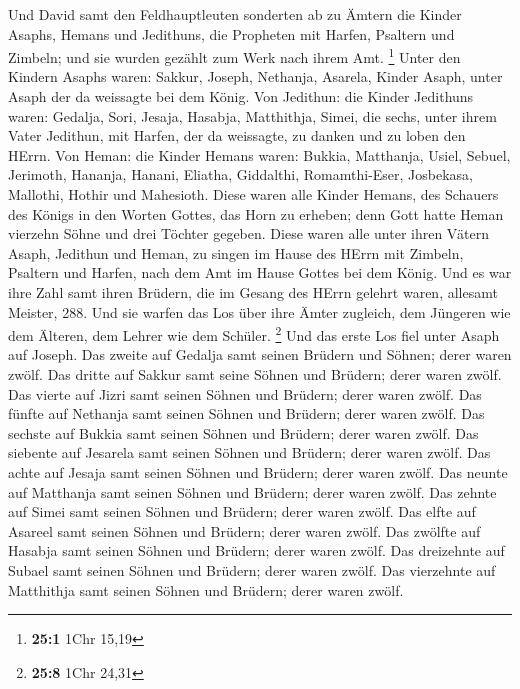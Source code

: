  Und David samt den Feldhauptleuten sonderten ab zu Ämtern
die Kinder Asaphs, Hemans und Jedithuns, die Propheten mit Harfen,
Psaltern und Zimbeln; und sie wurden gezählt zum Werk nach ihrem Amt.
\footnote{\textbf{25:1} 1Chr 15,19}  Unter den Kindern
Asaphs waren: Sakkur, Joseph, Nethanja, Asarela, Kinder Asaph, unter
Asaph der da weissagte bei dem König.  Von Jedithun: die
Kinder Jedithuns waren: Gedalja, Sori, Jesaja, Hasabja, Matthithja,
Simei, die sechs, unter ihrem Vater Jedithun, mit Harfen, der da
weissagte, zu danken und zu loben den HErrn.  Von Heman:
die Kinder Hemans waren: Bukkia, Matthanja, Usiel, Sebuel, Jerimoth,
Hananja, Hanani, Eliatha, Giddalthi, Romamthi-Eser, Josbekasa, Mallothi,
Hothir und Mahesioth.  Diese waren alle Kinder Hemans, des
Schauers des Königs in den Worten Gottes, das Horn zu erheben; denn Gott
hatte Heman vierzehn Söhne und drei Töchter gegeben. 
Diese waren alle unter ihren Vätern Asaph, Jedithun und Heman, zu singen
im Hause des HErrn mit Zimbeln, Psaltern und Harfen, nach dem Amt im
Hause Gottes bei dem König.  Und es war ihre Zahl samt
ihren Brüdern, die im Gesang des HErrn gelehrt waren, allesamt Meister,
288.  Und sie warfen das Los über ihre Ämter zugleich, dem
Jüngeren wie dem Älteren, dem Lehrer wie dem Schüler. \footnote{\textbf{25:8}
  1Chr 24,31}  Und das erste Los fiel unter Asaph auf
Joseph. Das zweite auf Gedalja samt seinen Brüdern und Söhnen; derer
waren zwölf.  Das dritte auf Sakkur samt seine Söhnen und
Brüdern; derer waren zwölf.  Das vierte auf Jizri samt
seinen Söhnen und Brüdern; derer waren zwölf.  Das fünfte
auf Nethanja samt seinen Söhnen und Brüdern; derer waren zwölf.
 Das sechste auf Bukkia samt seinen Söhnen und Brüdern;
derer waren zwölf.  Das siebente auf Jesarela samt seinen
Söhnen und Brüdern; derer waren zwölf.  Das achte auf
Jesaja samt seinen Söhnen und Brüdern; derer waren zwölf.
 Das neunte auf Matthanja samt seinen Söhnen und Brüdern;
derer waren zwölf.  Das zehnte auf Simei samt seinen
Söhnen und Brüdern; derer waren zwölf.  Das elfte auf
Asareel samt seinen Söhnen und Brüdern; derer waren zwölf.
 Das zwölfte auf Hasabja samt seinen Söhnen und Brüdern;
derer waren zwölf.  Das dreizehnte auf Subael samt seinen
Söhnen und Brüdern; derer waren zwölf.  Das vierzehnte
auf Matthithja samt seinen Söhnen und Brüdern; derer waren zwölf.
